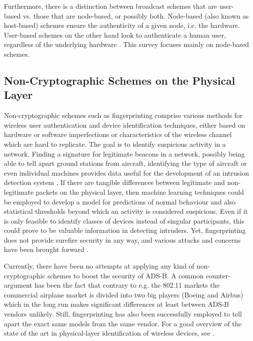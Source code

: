 \documentclass[english]{IEEEtran}
\begin{document}
Furthermore, there is a distinction between broadcast schemes that
are user-based vs. those that are node-based, or possibly both. Node-based
(also known as host-based) schemes ensure the authenticity of a given
node, i.e. the hardware. User-based schemes on the other hand look
to authenticate a human user, regardless of the underlying hardware
\cite{Woo1992}. This survey focuses mainly on node-based schemes.\\



\subsection{Non-Cryptographic Schemes on the Physical Layer}

Non-cryptographic schemes such as fingerprinting comprise various
methods for wireless user authentication and device identification
techniques, either based on hardware or software imperfections or
characteristics of the wireless channel which are hard to replicate.
The goal is to identify suspicious activity in a network. Finding
a signature for legitimate beacons in a network, possibly being able
to tell apart ground stations from aircraft, identifying the type
of aircraft or even individual machines provides data useful for the
development of an intrusion detection system \cite{Danev2012}. If
there are tangible differences between legitimate and non-legitimate
packets on the physical layer, then machine learning techniques could
be employed to develop a model for predictions of normal behaviour
and also statistical thresholds beyond which an activity is considered
suspicious. Even if it is only feasible to identify classes of devices
instead of singular participants, this could prove to be valuable
information in detecting intruders. Yet, fingerprinting does not provide
surefire security in any way, and various attacks and concerns have
been brought forward \cite{Danev2010}.

Currently, there have been no attempts at applying any kind of non-cryptographic
schemes to boost the security of ADS-B. A common counter-argument
has been the fact that contrary to e.g. the 802.11 markets the commercial
airplane market is divided into two big players (Boeing and Airbus)
which in the long run makes significant differences at least between
ADS-B vendors unlikely. Still, fingerprinting has also been successfully
employed to tell apart the exact same models from the same vendor.
For a good overview of the state of the art in physical-layer identification
of wireless devices, see \cite{Danev2012}. 
\end{document}
